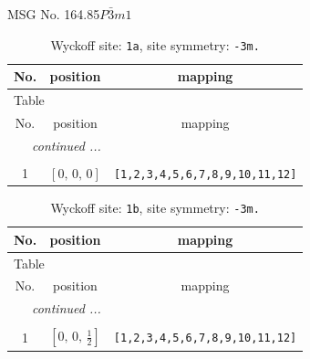 \documentclass[fleqn,8pt]{jsarticle}
\begin{document}
\setcounter{MaxMatrixCols}{32}

\renewcommand{\tablename}{Table~}
\renewcommand{\figurename}{Figure~}
\begin{center}
\LARGE
MSG No. 164.85\quad$P\bar{3}m1$
\end{center}
\renewcommand{\arraystretch}{1.2}
\begin{longtable}{ccc}
\caption{Wyckoff site: {\tt 1a}, site symmetry: {\tt -3m.}}
 \\
 \hline \hline
No. & position & mapping \\ \hline \endfirsthead

\multicolumn{2}{l}{\tablename\ \thetable{}} \\
 \hline \hline
No. & position & mapping \\ \hline \endhead

 \hline \hline
\multicolumn{2}{r}{\footnotesize\it continued ...} \\ \endfoot

 \hline \hline
\multicolumn{2}{r}{} \\ \endlastfoot

1 & $\left[ 0,\, 0,\, 0 \right]$ & {\tt [1,2,3,4,5,6,7,8,9,10,11,12]} \\
\end{longtable}
\renewcommand{\arraystretch}{1.2}
\begin{longtable}{ccc}
\caption{Wyckoff site: {\tt 1b}, site symmetry: {\tt -3m.}}
 \\
 \hline \hline
No. & position & mapping \\ \hline \endfirsthead

\multicolumn{2}{l}{\tablename\ \thetable{}} \\
 \hline \hline
No. & position & mapping \\ \hline \endhead

 \hline \hline
\multicolumn{2}{r}{\footnotesize\it continued ...} \\ \endfoot

 \hline \hline
\multicolumn{2}{r}{} \\ \endlastfoot

1 & $\left[ 0,\, 0,\, \frac{1}{2} \right]$ & {\tt [1,2,3,4,5,6,7,8,9,10,11,12]} \\
\end{longtable}
\renewcommand{\arraystretch}{1.2}
\end{document}
